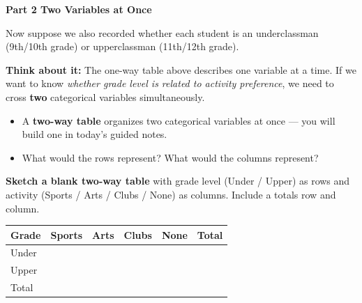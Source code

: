 \documentclass[10pt]{article}
\begin{document}
\vspace{0.3in}

{\large\bfseries\color{navy} Part 2 \quad Two Variables at Once}

\vspace{0.12in}

\noindent Now suppose we also recorded whether each student is an underclassman
(9th/10th grade) or upperclassman (11th/12th grade).

\vspace{0.14in}

\begin{tcolorbox}[colback=greenbg, colframe=greenacc, boxrule=0.8pt, arc=2mm,
    left=4mm, right=4mm, top=3mm, bottom=3mm]
    \small
    \textbf{Think about it:} The one-way table above describes one variable at a time.
    If we want to know \emph{whether grade level is related to activity preference},
    we need to cross \textbf{two} categorical variables simultaneously.
    \begin{itemize}[leftmargin=1.3em, itemsep=6pt]
        \item A \textbf{two-way table} organizes two categorical variables at once
              --- you will build one in today's guided notes.
        \item What would the rows represent? What would the columns represent?
    \end{itemize}
\end{tcolorbox}

\vspace{0.16in}

\noindent\textbf{Sketch a blank two-way table} with grade level (Under / Upper)
as rows and activity (Sports / Arts / Clubs / None) as columns. Include a totals row and column.

\vspace{0.15in}

\renewcommand{\arraystretch}{2.2}
\begin{tabularx}{\linewidth}{@{} l Y Y Y Y Y @{}}
\textbf{Grade} & \textbf{Sports} & \textbf{Arts} & \textbf{Clubs} & \textbf{None} & \textbf{Total} \\
\hline
Under          & & & & & \\
Upper          & & & & & \\
\hline
Total          & & & & & \\
\end{tabularx}
\end{document}
